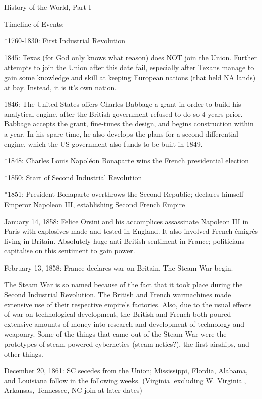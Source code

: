 \documentclass[white]{airship}
\begin{document}
\name{\wHistory{}} %
History of the World, Part I

Timeline of Events:

*1760-1830: First Industrial Revolution

1845: Texas (for God only knows what reason) does NOT join the Union.
Further attempts to join the Union after this date fail, especially
after Texans manage to gain some knowledge and skill at keeping
European nations (that held NA lands) at bay.  Instead, it is it's own
nation. 

1846: The United States offers Charles Babbage a grant in order to
build his analytical engine, after the British government refused to
do so 4 years prior.  Babbage accepts the grant, fine-tunes the
design, and begins construction within a year.  In his spare time, he
also develops the plans for a second differential engine, which the US
government also funds to be built in 1849. 

*1848: Charles Louis Napoléon Bonaparte wins the French presidential
 election 

*1850: Start of Second Industrial Revolution 

*1851: President Bonaparte overthrows the Second Republic; declares
 himself Emperor Napoleon III, establishing Second French Empire 


January 14, 1858: Felice Orsini and his accomplices assassinate
Napoleon III in Paris with explosives made and tested in England.  It
also involved French émigrés living in Britain.  Absolutely huge
anti-British sentiment in France; politicians capitalise on this
sentiment to gain power. 

February 13, 1858: France declares war on Britain.  The Steam War begin.

The Steam War is so named because of the fact that it took place
during the Second Industrial Revolution.  The British and French
warmachines made extensive use of their respective empire's factories.
Also, due to the usual effects of war on technological development,
the British and French both poured extensive amounts of money into
research and development of technology and weaponry.  Some of the
things that came out of the Steam War were the prototypes of
steam-powered cybernetics (steam-netics?), the first airships, and
other things.

December 20, 1861: SC secedes from the Union; Mississippi, Flordia,
Alabama, and Louisiana follow in the following weeks. (Virginia
[excluding W. Virginia], Arkansas, Tennessee, NC join at later dates)
\end{document}
